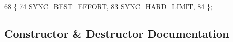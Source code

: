 \begin{DoxyCode}
68                            \{
74     \hyperlink{classns3_1_1RealtimeSimulatorImpl_a97b84e6926b9602a6d7c7326bf485807aa22b68b600e38987c93c0b3eb786aefe}{SYNC\_BEST\_EFFORT}, 
83     \hyperlink{classns3_1_1RealtimeSimulatorImpl_a97b84e6926b9602a6d7c7326bf485807ada42280d3e94930f3335552b4a93a36d}{SYNC\_HARD\_LIMIT},  
84   \};
\end{DoxyCode}


\subsection{Constructor \& Destructor Documentation}

